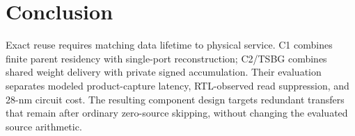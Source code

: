 \documentclass[journal]{IEEEtran}
\begin{document}
\section{Conclusion}
Exact reuse requires matching data lifetime to physical service.  C1 combines
finite parent residency with single-port reconstruction; C2/TSBG combines
shared weight delivery with private signed accumulation.  Their evaluation
separates modeled product-capture latency, RTL-observed read suppression, and
28-nm circuit cost.  The resulting component design targets redundant
transfers that remain after ordinary zero-source skipping, without changing
the evaluated source arithmetic.

\newpage


\end{document}
